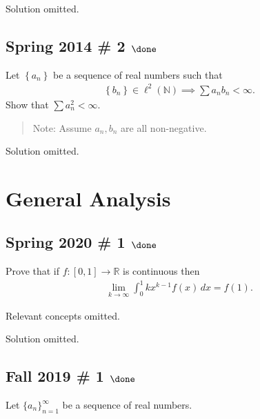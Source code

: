 
Solution omitted.

\hypertarget{spring-2014-2-done}{%
\subsection{\texorpdfstring{Spring 2014 \# 2
\(\done\)}{Spring 2014 \# 2 \textbackslash done}}\label{spring-2014-2-done}}

Let \(\left\{{a_n}\right\}\) be a sequence of real numbers such that
\begin{align*}
\left\{{b_n}\right\} \in \ell^2({\mathbb{N}}) \implies \sum a_n b_n < \infty.
\end{align*}
Show that \(\sum a_n^2 < \infty\).

\begin{quote}
Note: Assume \(a_n, b_n\) are all non-negative.
\end{quote}


Solution omitted.

\hypertarget{general-analysis}{%
\section{General Analysis}\label{general-analysis}}

\hypertarget{spring-2020-1-done}{%
\subsection{\texorpdfstring{Spring 2020 \# 1
\(\done\)}{Spring 2020 \# 1 \textbackslash done}}\label{spring-2020-1-done}}

Prove that if \(f: [0, 1] \to {\mathbb{R}}\) is continuous then
\begin{align*}
\lim_{k\to\infty} \int_0^1 kx^{k-1} f(x) \,dx = f(1)
.\end{align*}

Relevant concepts omitted.

Solution omitted.

\hypertarget{fall-2019-1-done}{%
\subsection{\texorpdfstring{Fall 2019 \# 1
\(\done\)}{Fall 2019 \# 1 \textbackslash done}}\label{fall-2019-1-done}}

Let \(\{a_n\}_{n=1}^\infty\) be a sequence of real numbers.

